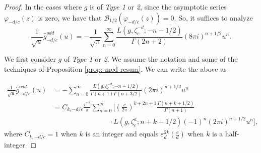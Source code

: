\documentclass[10pt,a4paper]{amsart}
\begin{document}
\begin{proof}	
In the cases where $g$ is of \emph{Type 1} or \emph{2}, since the asymptotic series $\varphi_{-d/c}(z)$ is zero, we have that $\mathcal{B}_{1/2}(\varphi_{-d/c}(z))=0$. So, it suffices to analyze 
 \[\frac{1}{\sqrt{u}}\widehat{g}_{-d/c}^{odd}(u) = -\frac{1}{\sqrt{\pi }} \sum_{n=0}^\infty \frac{ L(g, \zeta_c^{-d};-n-1/2)}{\Gamma(2n+2)}(8\pi i)^{n+1/2}u^{n}.
\]
 
We first consider $g$ of \emph{Type 1} or \emph{2}. We assume the notation and some of the techniques of Proposition \ref{prop: med resum}. 
We can write the above as 

 \begin{align*}\frac{1}{\sqrt{u}}\widehat{g}_{-d/c}^{odd}(u) &= - \sum_{n=0}^\infty \frac{ L(g, \zeta_c^{-d};-n-1/2)}{\Gamma(n+1)\Gamma(n+3/2)}(2\pi i)^{n+1/2}u^{n}\\
 &=C_{k, -d/c} \frac{i^{-k}}{\pi} \sum_{n=0}^\infty \Big\lbrack \left(\frac{c}{2\pi}\right)^{k+2n+1}\frac{\Gamma(n+k+1/2)}{\Gamma(n+1)}\\ & \quad \quad \quad \quad\quad \quad\quad \quad\cdot L(g, \zeta_c^{a}; n+k+1/2) (-1)^n(2\pi i)^{n+1/2}u^n\Big\rbrack,
\end{align*}
where $C_{k, -d/c}=1$ when $k$ is an integer and equals $\varepsilon_d^{2k}\left(\frac{c}{d}\right)$ when $k$ is a half-integer. 



\end{proof}
\end{document}
